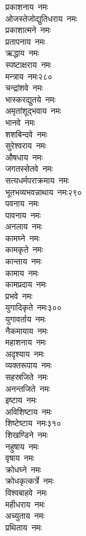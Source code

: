 \begin{multicols}{2}
\begin{flushleft}
प्रकाशनाय~नमः\\
ओजस्तेजोद्युतिधराय~नमः\\
प्रकाशात्मने~नमः\\
प्रतापनाय~नमः\\
ऋद्धाय~नमः\\
स्पष्टाक्षराय~नमः\\
मन्त्राय~नमः\hfill २८०\\
चन्द्रांशवे~नमः\\
भास्करद्युतये~नमः\\
अमृतांशूद्भवाय~नमः\\
भानवे~नमः\\
शशबिन्दवे~नमः\\
सुरेश्वराय~नमः\\
औषधाय~नमः\\
जगतस्सेतवे~नमः\\
सत्यधर्मपराक्रमाय~नमः\\
भूतभव्यभवन्नाथाय~नमः\hfill २९०\\
पवनाय~नमः\\
पावनाय~नमः\\
अनलाय~नमः\\
कामघ्ने~नमः\\
कामकृते~नमः\\
कान्ताय~नमः\\
कामाय~नमः\\
कामप्रदाय~नमः\\
प्रभवे~नमः\\
युगादिकृते~नमः\hfill ३००\\
युगावर्ताय~नमः\\
नैकमायाय~नमः\\
महाशनाय~नमः\\
अदृश्याय~नमः\\
व्यक्तरूपाय~नमः\\
सहस्रजिते~नमः\\
अनन्तजिते~नमः\\
इष्टाय~नमः\\
अविशिष्टाय~नमः\\
शिष्टेष्टाय~नमः\hfill ३१०\\
शिखण्डिने~नमः\\
नहुषाय~नमः\\
वृषाय~नमः\\
क्रोधघ्ने~नमः\\
क्रोधकृत्कर्त्रे~नमः\\
विश्वबाहवे~नमः\\
महीधराय~नमः\\
अच्युताय~नमः\\
प्रथिताय~नमः\\

\end{flushleft}
\end{multicols}
